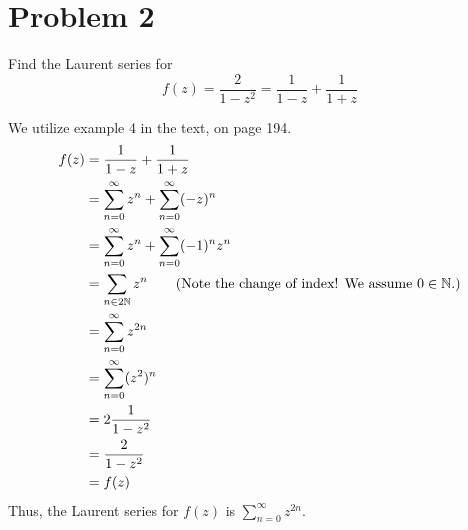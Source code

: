 \documentclass{article}
\theoremstyle{definition}
\newcommand{\N}{\mathbb{N}}
\begin{document}
\section{Problem 2}
Find the Laurent series for 
\[ f(z)= \frac{2}{1-z^2} = \frac{1}{1-z} + \frac{1}{1+z} \]

We utilize example 4 in the text, on page 194.
\begin{align*}
f(z) &= \frac{1}{1-z} + \frac{1}{1+z} \\
&= \sum_{n=0}^\infty z^n + \sum_{n=0}^\infty (-z)^n \\
&= \sum_{n=0}^\infty z^n + \sum_{n=0}^\infty (-1)^n z^n \\
&= \sum_{n \in 2\N} z^n \tag{Note the change of index! We assume $0\in\N$.}\\
&= \sum_{n=0}^\infty z^{2n} \\
&= \sum_{n=0}^\infty (z^2)^n \\
&= 2 \frac{1}{1-z^2} \\
&= \frac{2}{1-z^2} \\
&= f(z)
\end{align*}
Thus, the Laurent series for $f(z)$ is $\sum_{n=0}^\infty z^{2n}$.
\end{document}
